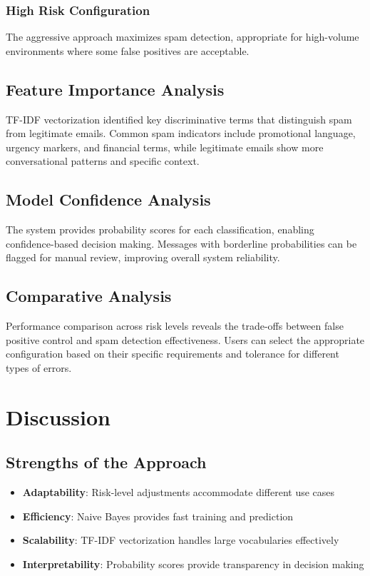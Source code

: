 \documentclass[12pt,a4paper]{article}
\begin{document}
\subsubsection{High Risk Configuration}
The aggressive approach maximizes spam detection, appropriate for high-volume environments where some false positives are acceptable.

\subsection{Feature Importance Analysis}

TF-IDF vectorization identified key discriminative terms that distinguish spam from legitimate emails. Common spam indicators include promotional language, urgency markers, and financial terms, while legitimate emails show more conversational patterns and specific context.

\subsection{Model Confidence Analysis}

The system provides probability scores for each classification, enabling confidence-based decision making. Messages with borderline probabilities can be flagged for manual review, improving overall system reliability.

\subsection{Comparative Analysis}

Performance comparison across risk levels reveals the trade-offs between false positive control and spam detection effectiveness. Users can select the appropriate configuration based on their specific requirements and tolerance for different types of errors.


\section{Discussion}

\subsection{Strengths of the Approach}

\begin{itemize}
    \item \textbf{Adaptability}: Risk-level adjustments accommodate different use cases
    \item \textbf{Efficiency}: Naive Bayes provides fast training and prediction
    \item \textbf{Scalability}: TF-IDF vectorization handles large vocabularies effectively
    \item \textbf{Interpretability}: Probability scores provide transparency in decision making
\end{itemize}
\end{document}
